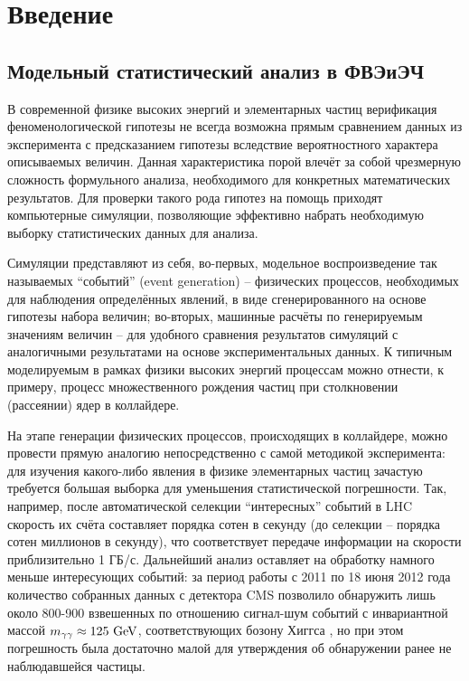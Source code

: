 \section{Введение}
\subsection{Модельный статистический анализ в ФВЭиЭЧ}
В современной физике высоких энергий и элементарных частиц верификация феноменологической гипотезы не всегда возможна прямым сравнением данных из эксперимента с предсказанием гипотезы вследствие вероятностного характера описываемых величин. Данная характеристика порой влечёт за собой чрезмерную сложность формульного анализа, необходимого для конкретных математических результатов. Для проверки такого рода гипотез на помощь приходят компьютерные симуляции, позволяющие эффективно набрать необходимую выборку статистических данных для анализа.

Симуляции представляют из себя, во-первых, модельное воспроизведение так называемых ``событий'' (event generation) -- физических процессов, необходимых для наблюдения определённых явлений, в виде сгенерированного на основе гипотезы набора величин; во-вторых, машинные расчёты по генерируемым значениям величин -- для удобного сравнения результатов симуляций с аналогичными результатами на основе экспериментальных данных\cite{EventGeneration}. К типичным моделируемым в рамках физики высоких энергий процессам можно отнести, к примеру, процесс множественного рождения частиц при столкновении (рассеянии) ядер в коллайдере.

На этапе генерации физических процессов, происходящих в коллайдере, можно провести прямую аналогию непосредственно с самой методикой эксперимента: для изучения какого-либо явления в физике элементарных частиц зачастую требуется большая выборка для уменьшения статистической погрешности. Так, например, после автоматической селекции ``интересных'' событий в LHC скорость их счёта составляет порядка сотен в секунду (до селекции -- порядка сотен миллионов в секунду), что соответствует передаче информации на скорости приблизительно 1 ГБ/с. Дальнейший анализ оставляет на обработку намного меньше интересующих событий: за период работы с 2011 по 18 июня 2012 года количество собранных данных с детектора CMS позволило обнаружить лишь около 800-900 взвешенных по отношению сигнал-шум событий с инвариантной массой $m_{\gamma \gamma} \approx 125 \textnormal{ GeV}$, соответствующих бозону Хиггса \cite{HiggsSt}, но при этом погрешность была достаточно малой для утверждения об обнаружении ранее не наблюдавшейся частицы.
